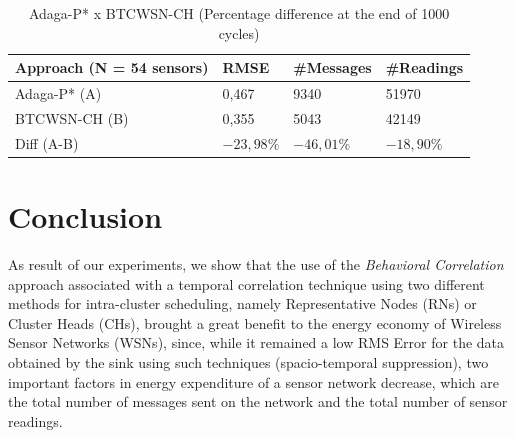 \documentclass[conference]{IEEEtran}
\begin{document}
\begin{table}[h!]
\caption{Adaga-P* x BTCWSN-CH (Percentage difference at the end of 1000 cycles)}
\begin{center}
\begin{tabular}{|l||l|l|l|}
\hline
Approach (N = 54 sensors) &RMSE &\#Messages &\#Readings \\
\hline\hline
Adaga-P* (A) &0,467 &9340 &51970 \\
\hline
BTCWSN-CH (B) &0,355 &5043 &42149 \\
\hline
Diff (A-B) &$-23,98\%$ &$-46,01\%$ &$-18,90\%$ \\
\hline
\end{tabular}
\end{center}
\end{table}


\section{Conclusion}

As result of our experiments, we show that the use of the \textit{Behavioral
Correlation} approach associated with a temporal correlation technique using two
different methods for intra-cluster scheduling, namely Representative Nodes
(RNs) or Cluster Heads (CHs), brought a great benefit to the energy economy of
Wireless Sensor Networks (WSNs), since, while it remained a low RMS Error for
the data obtained by the sink using such techniques (spacio-temporal
suppression), two important factors in energy expenditure of a sensor network
decrease, which are the total number of messages sent on the network and the
total number of sensor readings.






  
\end{document}
